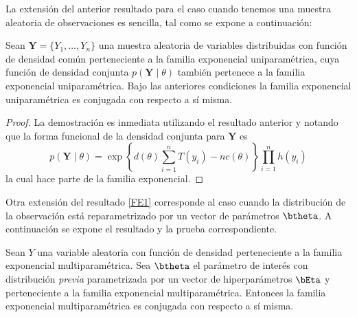 La extensión del anterior resultado para el caso cuando tenemos una muestra aleatoria de observaciones es sencilla, tal como se expone a continuación:
\begin{Res}
Sean $\mathbf{Y}=\{Y_1, \ldots, Y_n\}$ una muestra aleatoria de variables distribuidas con función de densidad común perteneciente a la familia exponencial uniparamétrica, cuya función de densidad conjunta $p(\mathbf{Y} \mid \theta)$ también pertenece a la familia exponencial uniparamétrica. Bajo las anteriores condiciones la familia exponencial uniparamétrica es conjugada con respecto a sí misma.
\end{Res}

\begin{proof}
La demostración es inmediata utilizando el resultado anterior y notando que la forma funcional de la densidad conjunta para $\mathbf{Y}$ es
\begin{equation}
p(\mathbf{Y} \mid \theta)=\exp\left\{d(\theta)\sum_{i=1}^nT(y_i)-nc(\theta)\right\}\prod_{i=1}^nh(y_i)
\end{equation}
la cual hace parte de la familia exponencial.
\end{proof}

Otra extensión del resultado \ref{FE1} corresponde al caso cuando la distribución de la observación está reparametrizado por un vector de parámetros $\btheta$. A continuación se expone el resultado y la prueba correspondiente.

\begin{Res}
Sean $Y$ una variable aleatoria con función de densidad perteneciente a la familia exponencial multiparamétrica. Sea $\btheta$ el parámetro de interés con distribución \emph{previa} parametrizada por un vector de hiperparámetros $\bEta$ y perteneciente a la familia exponencial multiparamétrica. Entonces la familia exponencial multiparamétrica es conjugada con respecto a sí misma.
\end{Res}

